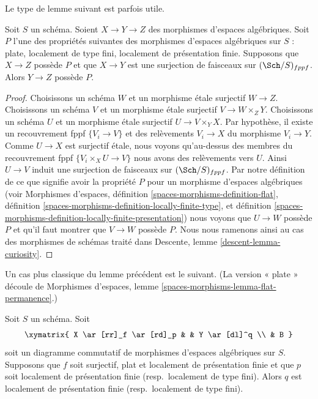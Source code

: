 \noindent
Le type de lemme suivant est parfois utile.

\begin{lemma}
\label{lemma-curiosity}
Soit $S$ un schéma. Soient $X \to Y \to Z$ des morphismes d'espaces algébriques.
Soit $P$ l'une des propriétés suivantes des morphismes d'espaces algébriques
sur $S$ :
plate, localement de type fini, localement de présentation finie.
Supposons que $X \to Z$ possède $P$ et que
$X \to Y$ est une surjection de faisceaux sur $(\Sch/S)_{fppf}$.
Alors $Y \to Z$ possède $P$.
\end{lemma}

\begin{proof}
Choisissons un schéma $W$ et un morphisme \'etale surjectif $W \to Z$.
Choisissons un schéma $V$ et un morphisme \'etale surjectif $V \to W \times_Z Y$.
Choisissons un schéma $U$ et un morphisme \'etale surjectif $U \to V \times_Y X$.
Par hypothèse, il existe un recouvrement fppf $\{V_i \to V\}$ et des
relèvements $V_i \to X$ du morphisme $V_i \to Y$. Comme $U \to X$ est surjectif
\'etale, nous voyons qu'au-dessus des membres du recouvrement fppf
$\{V_i \times_X U \to V\}$ nous avons des relèvements vers $U$. Ainsi $U \to V$ induit
une surjection de faisceaux sur $(\Sch/S)_{fppf}$.
Par notre définition de ce que signifie avoir la propriété $P$ pour un
morphisme d'espaces algébriques (voir
Morphismes d'espaces,
définition \ref{spaces-morphisms-definition-flat},
définition \ref{spaces-morphisms-definition-locally-finite-type}, et
définition \ref{spaces-morphisms-definition-locally-finite-presentation})
nous voyons que $U \to W$ possède $P$ et qu'il faut montrer que $V \to W$ possède $P$.
Nous nous ramenons ainsi au cas des morphismes de schémas
traité dans
Descente, lemme \ref{descent-lemma-curiosity}.
\end{proof}

\noindent
Un cas plus classique du lemme précédent est le suivant.
(La version « plate » découle de
Morphismes d'espaces, lemme \ref{spaces-morphisms-lemma-flat-permanence}.)

\begin{lemma}
\label{lemma-flat-finitely-presented-permanence}
Soit $S$ un schéma. Soit
$$
\xymatrix{
X \ar[rr]_f \ar[rd]_p & &
Y \ar[dl]^q \\
& B
}
$$
soit un diagramme commutatif de morphismes d'espaces algébriques sur $S$.
Supposons que $f$ soit surjectif, plat et localement de présentation finie
et que $p$ soit localement de présentation finie (resp.\ localement
de type fini). Alors $q$ est localement de présentation finie
(resp.\ localement de type fini).
\end{lemma}

